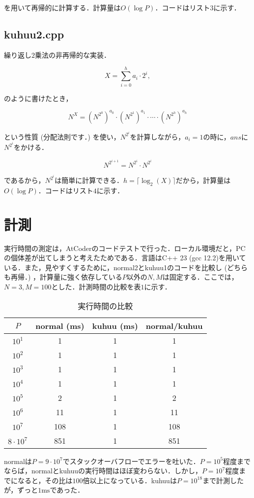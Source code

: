 \documentclass[slide,20pt]{ltjsarticle}
\begin{document}
を用いて再帰的に計算する．計算量は$O(\log P)$．コードはリスト$3$に示す．

\newpage


\newpage

\subsection*{kuhuu2.cpp}
繰り返し$2$乗法の非再帰的な実装．

\[ X = \sum_{i = 0} ^ {h} a_i \cdot 2 ^ i, \]

のように書けたとき，

\[ N ^ X = \left(N ^ {2 ^ 0}\right) ^ {a_0} \cdot \left(N ^ {2 ^ 1}\right) ^ {a_1} \cdot \cdots \cdot \left(N ^ {2 ^ h}\right) ^ {a_h} \]

という性質 (分配法則です．) を使い，$N ^ {2 ^ i}$を計算しながら，$a_i = 1$の時に，$ans$に$N ^ {2 ^ i}$をかける．

\[ N ^ {2 ^ {i + 1}} = N ^ {2 ^ {i}} \cdot N ^ {2 ^ {i}} \]

であるから，$N ^ {2 ^ i}$は簡単に計算できる．$h = \lceil \log_2(X) \rceil$だから，計算量は$O(\log P)$．コードはリスト$4$に示す．

\newpage


\section*{計測}
実行時間の測定は，AtCoderのコードテストで行った．ローカル環境だと，PCの個体差が出てしまうと考えたためである．言語はC++ 23 (gcc 12.2)を用いている．また，見やすくするために，normal2とkuhuu1のコードを比較し (どちらも再帰．) ，計算量に強く依存している$P$以外の$N, M$は固定する．ここでは，$N = 3, M = 100$とした．計測時間の比較を表$1$に示す．

\begin{center}
\begin{table}[ht]
  \centering
  \caption{実行時間の比較}
\begin{tabular}{|c|c|c|c|}  
  \hline
  $P$ & normal (ms) & kuhuu (ms) & normal/kuhuu   \\
  \hline
  $10 ^ 1$ & 1 & 1 & 1 \\
  \hline
  $10 ^ 2$ & 1 & 1 & 1 \\
  \hline
  $10 ^ 3$ & 1 & 1 & 1 \\
  \hline
  $10 ^ 4$ & 1 & 1 & 1 \\
  \hline 
  $10 ^ 5$ & 2 & 1 & 2 \\
  \hline
  $10 ^ 6$ & 11 & 1 & 11 \\
  \hline
  $10 ^ 7$ & 108 & 1 & 108 \\
  \hline 
  $8 \cdot 10 ^ 7$ & 851 & 1 & 851 \\
  \hline
\end{tabular}
\end{table}
\end{center}
normalは$P = 9 \cdot 10 ^ 7$でスタックオーバフローでエラーを吐いた．$P = 10 ^ 5$程度までならば，normalとkuhuuの実行時間はほぼ変わらない．しかし，$P = 10 ^ 7$程度までになると，その比は$100$倍以上になっている．kuhuuは$P = 10 ^ {18}$まで計測したが，ずっと$1 \mathrm{ms}$であった．
\end{document}
